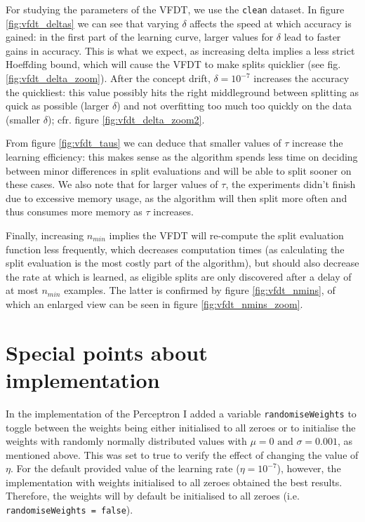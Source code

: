 \documentclass[12pt]{article}
\begin{document}
For studying the parameters of the VFDT, we use the \texttt{clean} dataset. In figure \ref{fig:vfdt_deltas} we can see that varying $\delta$ affects the speed at which accuracy is gained: in the first part of the learning curve, larger values for $\delta$ lead to faster gains in accuracy. This is what we expect, as increasing delta implies a less strict Hoeffding bound, which will cause the VFDT to make splits quicklier (see fig. \ref{fig:vfdt_delta_zoom}). After the concept drift, $\delta = 10^{-7}$ increases the accuracy the quickliest: this value possibly hits the right middleground between splitting as quick as possible (larger $\delta$) and not overfitting too much too quickly on the data (smaller $\delta$); cfr. figure \ref{fig:vfdt_delta_zoom2}.

From figure \ref{fig:vfdt_taus} we can deduce that smaller values of $\tau$ increase the learning efficiency: this makes sense as the algorithm spends less time on deciding between minor differences in split evaluations and will be able to split sooner on these cases. We also note that for larger values of $\tau$, the experiments didn't finish due to excessive memory usage, as the algorithm will then split more often and thus consumes more memory as $\tau$ increases.

Finally, increasing $n_{min}$ implies the VFDT will re-compute the split evaluation function less frequently, which decreases computation times (as calculating the split evaluation is the most costly part of the algorithm), but should also decrease the rate at which is learned, as eligible splits are only discovered after a delay of at most $n_{min}$ examples. The latter is confirmed by figure \ref{fig:vfdt_nmins}, of which an enlarged view can be seen in figure \ref{fig:vfdt_nmins_zoom}.

\section{Special points about implementation}
In the implementation of the Perceptron I added a variable \texttt{randomiseWeights} to toggle between the weights being either  initialised to all zeroes or to initialise the weights with randomly normally distributed values with $\mu = 0 \text{ and } \sigma = 0.001$, as mentioned above. This was set to true to verify the effect of changing the value of $\eta$. For the default provided value of the learning rate ($\eta = 10^{-7}$), however, the implementation with weights initialised to all zeroes obtained the best results. Therefore, the weights will by default be initialised to all zeroes (i.e. \texttt{randomiseWeights = false}).
\end{document}
